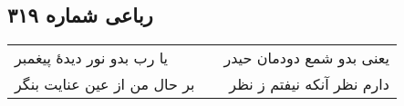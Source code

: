 \begin{center}
\section*{رباعی شماره ۳۱۹}
\label{sec:sh319}
\begin{longtable}{l p{0.5cm} r}
یا رب بدو نور دیدهٔ پیغمبر
&&
یعنی بدو شمع دودمان حیدر
\\
بر حال من از عین عنایت بنگر
&&
دارم نظر آنکه نیفتم ز نظر
\\
\end{longtable}
\end{center}
